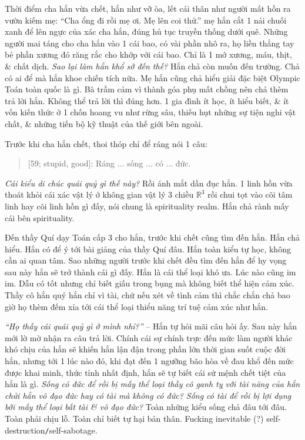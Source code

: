 \documentclass[12pt,twoside]{book}
\begin{document}
Thời điểm cha hắn vừa chết, hắn như vỡ òa, lết cái thân như người mất hồn ra vườn kiếm mẹ: ``Cha ổng đi rồi mẹ ơi. Mẹ lên coi thử.'' mẹ hắn cắt 1 nải chuối xanh để lên ngực của xác cha hắn, đúng hủ tục truyền thống dưới quê. Những người mai táng cho cha hắn vào 1 cái bao, có vài phần nhô ra, họ liền thẳng tay bẻ phần xương đó răng rắc cho khớp với cái bao. Chỉ là 1 mớ xương, máu, thịt, \& chất dịch. {\it Sao lại làm hắn khổ sở đến thế?} Hắn chả còn muốn đến trường. Chả có ai để mà hắn khoe chiến tích nữa. Mẹ hắn cũng chả hiểu giải đặc biệt Olympic Toán toàn quốc là gì. Bà trầm cảm vì thành góa phụ mất chồng nên chả thèm trả lời hắn. Không thể trả lời thì đúng hơn. 1 gia đình ít học, ít hiểu biết, \& ít vốn kiến thức ở 1 chốn hoang vu như rừng sâu, thiếu hụt những sự tiện nghi vật chất, \& những tiến bộ kỹ thuật của thế giới bên ngoài.

Trước khi cha hắn chết, thoi thóp chỉ để ráng nói 1 câu:
\begin{quote}
	{ [59; stupid, good]}: Ráng $\ldots$ sống $\ldots$ có $\ldots$ đức.
\end{quote}
{\it Cái kiểu di chúc quái quỷ gì thế này?} Rồi ánh mắt dần đục hẳn. 1 linh hồn vừa thoát khỏi cái xác vật lý ở không gian vật lý 3 chiều $\mathbb{R}^3$ rồi chui tọt vào cõi tâm linh hay cõi linh hồn gì đấy, nói chung là spirituality realm. Hắn chả rành mấy cái bên spirituality.

Đến thầy {\sc Quí} dạy Toán cấp 3 cho hắn, trước khi chết cũng tìm đến hắn. Hắn chả hiểu. Hắn có để ý tới bài giảng của thầy Quí đâu. Hắn toàn kiểu tự học, không cần ai quan tâm. Sao những người trước khi chết đều tìm đến hắn để hy vọng sau này hắn sẽ trở thành cái gì đấy. Hắn là cái thể loại khó ưa. Lúc nào cũng im im. Dẫu có tốt nhưng chỉ biết giấu trong bụng mà không biết thể hiện cảm xúc. Thầy cô hắn quý hắn chỉ vì tài, chứ nếu xét về tình cảm thì chắc chắn chả bao giờ họ thèm đếm xỉa tới cái thể loại thiểu năng trí tuệ cảm xúc như hắn.

{\it``Họ thấy cái quái quỷ gì ở mình nhỉ?''} -- Hắn tự hỏi mãi câu hỏi ấy. Sau này hắn mới lờ mờ nhận ra câu trả lời. Chính cái sự chính trực đến mức làm người khác khó chịu của hắn sẽ khiến hắn lận đận trong phần lớn thời gian suốt cuộc đời hắn, nhưng tới 1 lúc nào đó, khi đạt đến 1 ngưỡng bão hòa về đau khổ đến mức được khai minh, thức tỉnh nhất định, hắn sẽ tự biết cái sứ mệnh chết tiệt của hắn là gì. {\it Sống có đức để rồi bị mấy thể loại thầy cô ganh tỵ với tài năng của hắn chửi hắn vô đạo đức hay có tài mà không có đức? Sống có tài để rồi bị lợi dụng bởi mấy thể loại bất tài \& vô đạo đức?} Toàn những kiểu sống chả đâu tới đâu. Toàn phải chịu lỗ. Toàn chỉ biết tự hại bản thân. Fucking inevitable (?) self-destruction{\tt/}self-sabotage.
\end{document}
